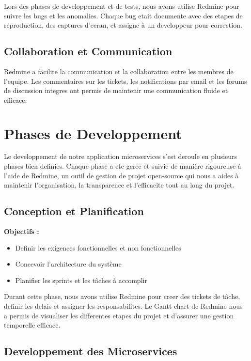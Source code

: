 \documentclass[a4paper, 11pt, openany]{report}
\begin{document}
Lors des phases de developpement et de tests, nous avons utilise Redmine pour suivre les bugs et les anomalies. Chaque bug etait documente avec des etapes de reproduction, des captures d'ecran, et assigne à un developpeur pour correction.

\subsection{Collaboration et Communication}

Redmine a facilite la communication et la collaboration entre les membres de l'equipe. Les commentaires sur les tickets, les notifications par email et les forums de discussion integres ont permis de maintenir une communication fluide et efficace.


\newpage

\section{Phases de Developpement}

Le developpement de notre application microservices s'est deroule en plusieurs phases bien definies. Chaque phase a ete geree et suivie de manière rigoureuse à l'aide de Redmine, un outil de gestion de projet open-source qui nous a aides à maintenir l'organisation, la transparence et l'efficacite tout au long du projet.

\subsection{Conception et Planification}

\textbf{Objectifs :}
\begin{itemize}
    \item Definir les exigences fonctionnelles et non fonctionnelles
    \item Concevoir l'architecture du système
    \item Planifier les sprints et les tâches à accomplir
\end{itemize}

Durant cette phase, nous avons utilise Redmine pour creer des tickets de tâche, definir les delais et assigner les responsabilites. Le Gantt chart de Redmine nous a permis de visualiser les differentes etapes du projet et d'assurer une gestion temporelle efficace.

\subsection{Developpement des Microservices}
\end{document}
